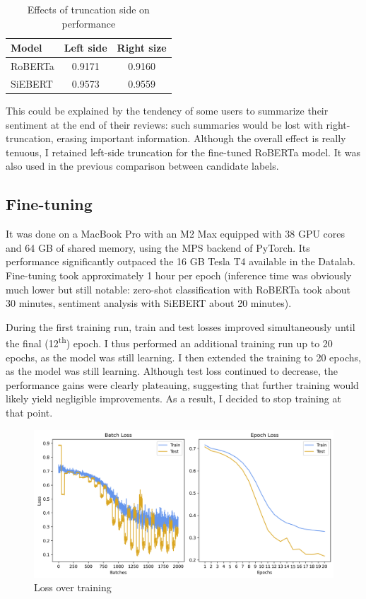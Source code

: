 \documentclass{article}
\begin{document}
\begin{table}
  \caption{Effects of truncation side on performance}
  \label{tab:truncation}
  \centering
  \begin{tabular}{lcc}
    \toprule
    Model & Left side & Right size \\
    \midrule
    RoBERTa & 0.9171 & 0.9160 \\
    SiEBERT & 0.9573 & 0.9559 \\
    \bottomrule
  \end{tabular}
\end{table}

This could be explained by the tendency of some users to summarize their sentiment at the end of their reviews: such summaries would be lost with right-truncation, erasing important information. Although the overall effect is really tenuous, I retained left-side truncation for the fine-tuned RoBERTa model. It was also used in the previous comparison between candidate labels.

\subsection{Fine-tuning}

It was done on a MacBook Pro with an M2 Max equipped with 38 GPU cores and 64 GB of shared memory, using the MPS backend of PyTorch. Its performance significantly outpaced the 16 GB Tesla T4 available in the Datalab. Fine-tuning took approximately 1 hour per epoch (inference time was obviously much lower but still notable: zero-shot classification with RoBERTa took about 30 minutes, sentiment analysis with SiEBERT about 20 minutes).

During the first training run, train and test losses improved simultaneously until the final (12\textsuperscript{th}) epoch. I thus performed an additional training run up to 20 epochs, as the model was still learning. I then extended the training to 20 epochs, as the model was still learning. Although test loss continued to decrease, the performance gains were clearly plateauing, suggesting that further training would likely yield negligible improvements. As a result, I decided to stop training at that point.

\begin{figure}
  \centering
  \includegraphics[width=\textwidth]{RoBERTa_learning_curves_1}
  \caption{Loss over training}
  \label{fig:roberta-learning-1}
\end{figure}
\end{document}
